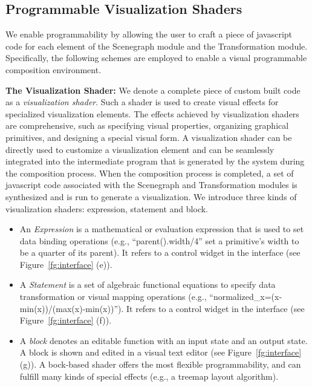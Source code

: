 \subsection{Programmable Visualization Shaders}
We enable programmability by allowing the user to craft a piece of javascript code for each element of the Scenegraph module and the Transformation module. Specifically, the following schemes are employed to enable a visual programmable composition environment.

\noindent \textbf{The Visualization Shader:}  We denote a complete piece of custom built code as a \emph{visualization shader}.  Such a shader is used to create visual effects for specialized visualization elements. The effects achieved by visualization shaders are comprehensive, such as specifying visual properties, organizing graphical primitives, and designing a special visual form.  A visualization shader can be directly used to customize a visualization element and can be seamlessly integrated into the intermediate program that is generated by the system during the composition process.
When the composition process is completed, a set of javascript code associated with the Scenegraph and Transformation modules is synthesized and is run to generate a visualization.
We introduce three kinds of visualization shaders: expression, statement and block.
\begin{itemize}
  \item An \emph{Expression} is a mathematical or evaluation expression  that is used to set data binding operations (e.g.,  ``parent().width/4'' set a primitive's width to be a quarter of its parent). It refers to a control widget in the interface (see Figure~\ref{fg:interface} (e)).
  \item A \emph{Statement} is a set of algebraic functional equations to specify data transformation or visual mapping operations (e.g., ``normalized\_x=(x-min(x))/(max(x)-min(x))''). It refers to a control widget in the interface (see Figure~\ref{fg:interface} (f)).
  \item A \emph{block} denotes an editable function  with an input state and an output state. A block is shown and edited in a visual text editor (see Figure~\ref{fg:interface} (g)).   A bock-based shader offers the most flexible programmability, and can fulfill many kinds of special effects (e.g., a treemap layout algorithm).
\end{itemize}
%


